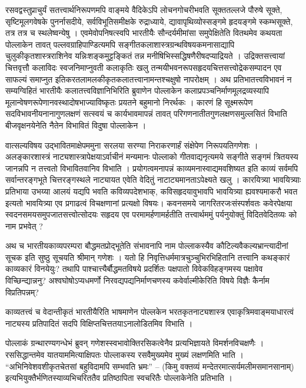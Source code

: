 {\dev रसवद्वस्तुप्राचुर्यं सतत्त्वार्थनिरूपणमपि वाङ्मये वैदिकेऽपि लोचनगोचरीभवति सूक्ततल्लजे पौरुषे सूक्ते, सृष्टिमूलगवेषके पुनर्नासदीये, सर्वविभूतिसमीक्षके रुद्राध्याये, द्यावापृथिव्योस्स\-ङ्गमे हृदयङ्गमे स्कम्भसूक्ते, तत्र तत्र च स्थलेष्वन्येषु । एवमेवोपनिषत्स्वपि भारतीयैः सौन्दर्य\-मीमांसा समुपेक्षितेति वितथमेव कथयता पोल्लाकेन तावत् पल्लवग्राहिपाण्डित्यमपि  सङ्गीतकलाशास्त्रग्रन्थविषयकमनासाद्यापि चुलुकीकृतशास्त्रराशिनेव यन्निःशङ्कमुट्टङ्कितं तन्न मनीषिभिस्सद्धिषणैरीषदप्याद्रियते । उद्रिक्तसत्त्वायां चित्तवृत्तौ कलाविदः स्वजनिमाप्नुवती कलाकृतिः खलु तन्मयीभवनरूपसहृदयचित्तसत्त्वोद्रेकसम्पादन एव साफल्यं समाप्नुत इति\break करतलामलकीकृतकलातत्त्वानामन्तश्चक्षुषो नापरोक्षम् । अथ प्रतिभातत्त्वविभावनं न सम्य\-ग्विहितं भारतीयैः कलातत्त्वविज्ञानिभिरिति ब्रुवाणेन पोल्लाकेन कलाप्रपञ्चनिर्माणमूलद्रव्य\-स्यापि मूलान्वेषणरूपेणानवस्थादोषभाज्याविष्कृतः प्रयतने बहुमानो निरर्थकः । कारणं हि सूक्ष्मरूपेण सदविभावनीयनानागुणलक्षणं सत्स्वयं च कार्यभावमापन्नं तावत् परिगणनातीत\-गुणलक्षणसमुल्लसितं विभाति बीजवृक्षनयेनेति नैतेन विभावितं विदुषा पोल्लाकेन ।}
\vskip 1pt

{\dev वात्सल्यविषय उद्भावितमाक्षेपममुना सरलया सरण्या निराकरणार्हं संक्षेपेण निरूपयति\break गणेशः । अलङ्कारशास्त्रं नाट्यशास्त्रापेक्षयाऽर्वाचीनं मन्यमानः पोल्लाको गीतवाद्यनृत्यमये सङ्गीते सङ्गमं त्रितयस्य जानन्नपि न तत्त्वतो विभावितवानिव विभाति । प्रयोगत्वमनापन्नं काव्यमनास्वाद्यमव\-शिष्यत इति काव्यं सर्वमपि सर्वान्तरङ्गभूते चित्तरङ्गस्थले नाट्यायत एवेति वेदितुं नाटाट्यमानताऽपेक्ष्यते खलु । कारयित्र्या भावयित्र्याः प्रतिभाया उभय्या आलयं यद्यपि भवति कविव्यपदेशभाक्, कविसहृदयावुभावपि भावयित्र्या ह्यवश्यमाकरौ भवत इत्यतो भावयित्र्या एव प्रगाढत्वं विचक्षणानां प्रत्यक्षो विषयः। कवनसमये जागरितरजःसंस्पर्शवतः कवेरपेक्षया स्वदनसमयसमुपजातसत्त्वोत्सोदयः सहृदय एव परमामर्हणामर्हतीति तत्त्वार्थममुं पर्यनुयोक्तुं विदितवेदितव्यः को नाम प्रभवेत् ?}

{\dev अथ च भारतीयकाव्यपरम्परा बौद्धमतप्रोद्भूतेति संभावनापि नाम पोल्लाकस्यैव कौटिल्य\-वैकल्यभ्रान्त्यादीनां सूचक इति सुष्ठु सूचयति श्रीमान् गणेशः । यतो हि निवृत्तिधर्ममात्रचुञ्चुभिरभि\-हितानि तत्त्वानि कथङ्कारं काव्यकारं विनयेयुः? तथापि पाश्चात्त्यैर्बौद्धमतविषये प्रदर्शितः पक्षपातो विवेकविहङ्गमस्य पक्षावेव विच्छिन्द्यान्ननु? अश्वघोषोऽप्यधमर्णो निरवद्यपद्य\-निर्माण\-चणस्य कवेर्वाल्मीकेरिति विषये विज्ञैः कैर्नाम विप्रतिपन्नम्?}

{\dev काव्यतत्त्वं च वेदान्तीकृतं भारतीयैरिति भाषमाणेन पोल्लकेन भरतकृतनाट्यशास्त्र एवाकृत्रिम\-वाङ्मयाधारत्वं नाट्यस्य प्रतिपादितं सदपि विक्षिप्तचित्ततयाऽनालोडितमिव विभाति ।}

{\dev पोल्लाकं ग्रन्थारण्यगन्धेभं ब्रुवन् गणेशस्स्वभावोक्तिरसिकत्वेनैव प्रत्यभिज्ञायते विमर्शन\-विच\-क्षणैः । रससिद्धान्तमेव यातयाममित्याक्षिपतः पोल्लाकस्य रसवैमुख्यमेव मुख्यं लक्षणमिति भाति । “अभिनिवेशवशीकृतचेतसां बहुविदामपि सम्भवति भ्रमः” – (किमु वक्तव्यं मन्देतरमात्सर्यमलीमसमानसानाम्) इत्यभियुक्तैर्भणितस्याव्यभिचरिततैव प्रतिष्ठापिता स्वचरितैः पोल्लाकेनेति प्रतिभाति ।}

